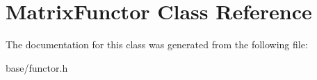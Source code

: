 \hypertarget{classMatrixFunctor}{}\section{Matrix\+Functor Class Reference}
\label{classMatrixFunctor}


The documentation for this class was generated from the following file\+:\begin{DoxyCompactItemize}
\item 
base/functor.\+h\end{DoxyCompactItemize}

